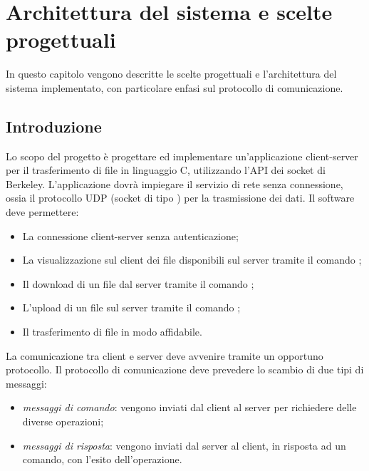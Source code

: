 \newpage

\chapter{Architettura del sistema e scelte progettuali}

In questo capitolo vengono descritte le scelte progettuali e l'architettura del sistema implementato, con particolare enfasi sul protocollo di comunicazione.

\section{Introduzione}
Lo scopo del progetto è progettare ed implementare un'applicazione client-server per il trasferimento di file in linguaggio C, utilizzando l'API dei socket di Berkeley.
L'applicazione dovrà impiegare il servizio di rete senza connessione, ossia il protocollo UDP (socket di tipo ) per la trasmissione dei dati.
Il software deve permettere:
\begin{itemize}
    \item La connessione client-server senza autenticazione;
    \item La visualizzazione sul client dei file disponibili sul server tramite il comando ;
    \item Il download di un file dal server tramite il comando ;
    \item L'upload di un file sul server tramite il comando ;
    \item Il trasferimento di file in modo affidabile.
\end{itemize}
La comunicazione tra client e server deve avvenire tramite un opportuno protocollo.
Il protocollo di comunicazione deve prevedere lo scambio di due tipi di messaggi:
\begin{itemize}
    \item \textit{messaggi di comando}: vengono inviati dal client al server per richiedere delle diverse operazioni;
    \item \textit{messaggi di risposta}: vengono inviati dal server al client, in risposta ad un comando, con l'esito dell'operazione.
\end{itemize}


